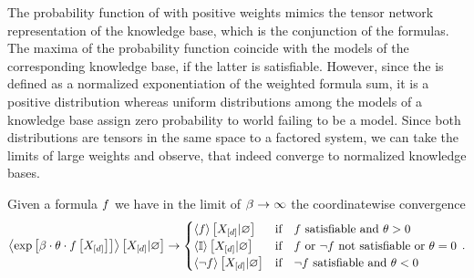 The probability function of \MarkovLogicNetworks{} with positive weights mimics the tensor network representation of the knowledge base, which is the conjunction of the formulas.
The maxima of the probability function coincide with the models of the corresponding knowledge base, if the latter is satisfiable.
However, since the \MarkovLogicNetwork{} is defined as a normalized exponentiation of the weighted formula sum, it is a positive distribution whereas uniform distributions among the models of a knowledge base assign zero probability to world failing to be a model.
Since both distributions are tensors in the same space to a factored system, we can take the limits of large weights and observe, that \MarkovLogicNetworks{} indeed converge to normalized knowledge bases.

\begin{lemma}
    \label{lem:localHardLimit}
    Given a formula $f$ we have in the limit of $\beta\rightarrow\infty$ the coordinatewise convergence
    \begin{align*}
        \left\langle \mathrm{exp}\left[\beta\cdot\theta\cdot f\left[X_{[d]}\right]\right]\right\rangle \left[ X_{[d]} | \varnothing \right] \rightarrow
        \begin{cases}
            \left\langle f\right\rangle \left[ X_{[d]} | \varnothing \right] & \text{if}\quad \text{$f$ satisfiable and } \theta>0\\
            \left\langle \mathbb{I}\right\rangle \left[ X_{[d]} | \varnothing \right] & \text{if}\quad \text{$f$ or $\lnot f$ not satisfiable or } \theta=0 \\
            \left\langle \lnot f\right\rangle \left[ X_{[d]} | \varnothing \right] & \text{if}\quad \text{$\lnot f$ satisfiable and } \theta<0\\
        \end{cases} \, .
    \end{align*}
\end{lemma}
